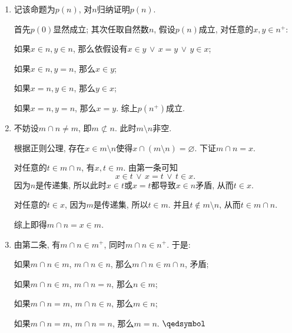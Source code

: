 
\begin{enumerate}
    \item 记该命题为$p(n)$, 对$n$归纳证明$p(n)$.
    
    \hspace{2.17em}
    首先$p(0)$显然成立; 其次任取自然数$n$, 假设$p(n)$成立, 对任意的$x,y\in n^+$:

    \hspace{2.17em}
    如果$x\in n,y\in n$, 那么依假设有$x\in y\,\lor\,x=y\,\lor\,y\in x$;

    \hspace{2.17em}
    如果$x\in n,y=n$, 那么$x\in y$;
    
    \hspace{2.17em}
    如果$x=n,y\in n$, 那么$y\in x$;
    
    \hspace{2.17em}
    如果$x=n,y=n$, 那么$x=y$. 综上$p(n^+)$成立.

    \item 不妨设$m\cap n\neq m$, 即$m\not\subset n$. 此时$m\setminus n$非空.

    \hspace{2.17em}
    根据正则公理, 存在$x\in m\setminus n$使得$x\cap(m\setminus n)=\varnothing$.
    下证$m\cap n=x$.

    \hspace{2.17em}
    对任意的$t\in m\cap n$, 有$x,t\in m$. 由第一条可知
    \[
        x\in t\,\lor\,x=t\,\lor\,t\in x.
    \]
    因为$n$是传递集, 所以此时$x\in t$或$x=t$都导致$x\in n$矛盾, 从而$t\in x$.

    \hspace{2.17em}
    对任意的$t\in x$, 因为$m$是传递集, 所以$t\in m$.
    并且$t\notin m\setminus n$, 从而$t\in m\cap n$.

    \hspace{2.17em}
    综上即得$m\cap n=x\in m$.


    \item 由第二条, 有$m\cap n\in m^+$, 同时$m\cap n\in n^+$. 于是:
    
    \hspace{2.17em}
    如果$m\cap n\in m$, $m\cap n\in n$, 那么$m\cap n\in m\cap n$, 矛盾;

    \hspace{2.17em}
    如果$m\cap n\in m$, $m\cap n=n$, 那么$n\in m$;
    
    \hspace{2.17em}
    如果$m\cap n=m$, $m\cap n\in n$, 那么$m\in n$;
    
    \hspace{2.17em}
    如果$m\cap n=m$, $m\cap n=n$, 那么$m=n$. \hfill $\qedsymbol$

\end{enumerate}





